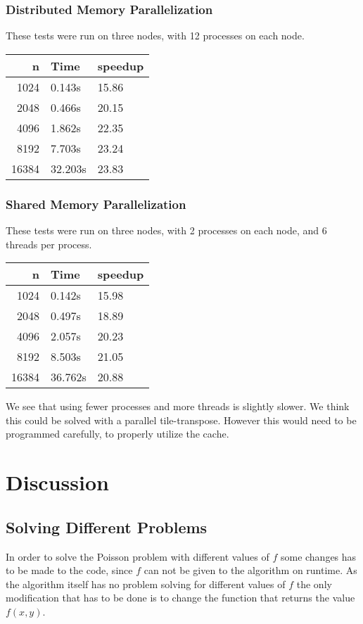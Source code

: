 \documentclass[a4paper, 12pt]{article}
\begin{document}
        \subsubsection{Distributed Memory Parallelization}
        These tests were run on three nodes, with 12 processes on each node.

        \begin{tabular}{|r|l|l|}
        \hline
        n & Time & speedup \\
        \hline
        1024 & 0.143s & 15.86 \\
        \hline
        2048 & 0.466s & 20.15 \\
        \hline
        4096 & 1.862s & 22.35 \\
        \hline
        8192 & 7.703s & 23.24\\
        \hline
        16384 & 32.203s & 23.83 \\
        \hline
        \end{tabular}
         
        \subsubsection{Shared Memory Parallelization}
        These tests were run on three nodes, with 2 processes on each node, and 6 threads per process.

        \begin{tabular}{|r|l|l|}
        \hline
        n & Time & speedup \\
        \hline
        1024 & 0.142s & 15.98 \\
        \hline
        2048 & 0.497s & 18.89 \\
        \hline
        4096 & 2.057s & 20.23 \\
        \hline
        8192 & 8.503s & 21.05\\
        \hline
        16384 & 36.762s & 20.88 \\
        \hline
        \end{tabular}
        
        We see that using fewer processes and more threads is slightly slower. We think this could be solved with a parallel tile-transpose. However this would need to be programmed carefully, to properly utilize the cache.

\section{Discussion}
	\subsection{Solving Different Problems}
	In order to solve the Poisson problem with different values of $f$ some changes has to be made to the code, since $f$ can not be given to the algorithm on runtime. As the algorithm itself has no problem solving for different values of $f$ the only modification that has to be done is to change the function that returns the value $f(x, y)$.
\end{document}
